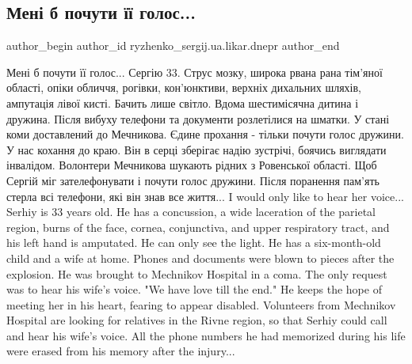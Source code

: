 
 
 
 
 
 
\subsection{Мені б почути її голос...}
\label{sec:09_12_2022.fb.ryzhenko_sergij.ua.likar.dnepr.1.meni_pochuty_ii_golos}
 
\ifcmt
 author_begin
   author_id ryzhenko_sergij.ua.likar.dnepr
 author_end
\fi

\obeycr
Мені б почути її голос...
Сергію 33.
Струс мозку, широка рвана рана тім'яної області, опіки обличчя, рогівки, кон'юнктиви, верхніх дихальних шляхів, ампутація лівої кисті.
Бачить лише світло.
Вдома шестимісячна дитина і дружина.
Після вибуху телефони та документи розлетілися на шматки.
У стані коми доставлений до Мечникова.
Єдине прохання - тільки почути голос дружини.
У нас кохання до краю.
Він в серці зберігає надію зустрічі, боячись виглядати інвалідом.
Волонтери Мечникова шукають рідних з Ровенської області.
Щоб Сергій міг зателефонувати і почути голос дружини.
Після поранення пам'ять стерла всі телефони, які він знав все життя...
I would only like to hear her voice...
Serhiy is 33 years old.
He has a concussion, a wide laceration of the parietal region, burns of the face, cornea, conjunctiva, and upper respiratory tract, and his left hand is amputated.
He can only see the light.
He has a six-month-old child and a wife at home.
Phones and documents were blown to pieces after the explosion.
He was brought to Mechnikov Hospital in a coma.
The only request was to hear his wife's voice.
"We have love till the end."
He keeps the hope of meeting her in his heart, fearing to appear disabled.
Volunteers from Mechnikov Hospital are looking for relatives in the Rivne region, so that Serhiy could call and hear his wife's voice.
All the phone numbers he had memorized during his life were erased from his memory after the injury...
\restorecr

